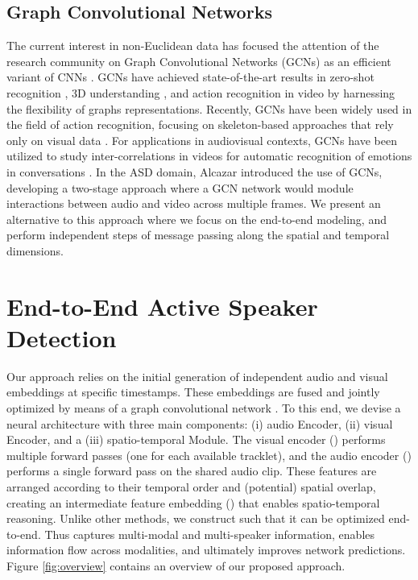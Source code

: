 \documentclass[10pt,twocolumn,letterpaper]{article}
\begin{document}
\subsection{Graph Convolutional Networks}
The current interest in non-Euclidean data \cite{Gkioxari2019Mesh,cv_action_jain2016structural,cv_inv_scene_johnson2018image,li2019sgas,cv_scene_li2018factorizable,g_tad} has focused the attention of the research community on Graph Convolutional Networks (GCNs) as an efficient variant of CNNs  \cite{kipf2016semi,wu2019simplifying}. GCNs have achieved state-of-the-art results in zero-shot recognition \cite{wang2018zero,kampffmeyer2019rethinking}, 3D understanding \cite{Gkioxari2019Mesh,li2019sgas,xie2019clouds}, and action recognition in video \cite{cv_action_jain2016structural,g_tad,cv_action_yan2018spatial} by harnessing the flexibility of graphs representations. Recently, GCNs have been widely used in the field of action recognition, focusing on skeleton-based approaches that rely only on visual data \cite{cai2021jolo,duhme2021fusion}. For applications in audiovisual contexts, GCNs have been utilized to study inter-correlations in videos for automatic recognition of emotions in conversations \cite{nie2020c,ren2021lr}. In the ASD domain, Alcazar \etal \cite{leon2021maas} introduced the use of GCNs, developing a two-stage approach where a GCN network would module interactions between audio and video across multiple frames. We present an alternative to this approach where we focus on the end-to-end modeling, and perform independent steps of message passing along the spatial and temporal dimensions. 



 \section{End-to-End Active Speaker Detection}
Our approach relies on the initial generation of independent audio and visual embeddings at specific timestamps. These embeddings are fused and jointly optimized by means of a graph convolutional network \cite{kipf2016semi}. To this end, we devise a neural architecture with three main components: (i) audio Encoder, (ii) visual Encoder, and a (iii) spatio-temporal Module. The visual encoder () performs multiple forward passes (one for each available tracklet), and the audio encoder () performs a single forward pass on the shared audio clip. These features are arranged according to their temporal order and (potential) spatial overlap, creating an intermediate feature embedding () that enables spatio-temporal reasoning. Unlike other methods, we construct  such that it can be optimized end-to-end. Thus  captures multi-modal and multi-speaker information, enables information flow across modalities, and ultimately improves network predictions. Figure \ref{fig:overview} contains an overview of our proposed approach.
\end{document}
